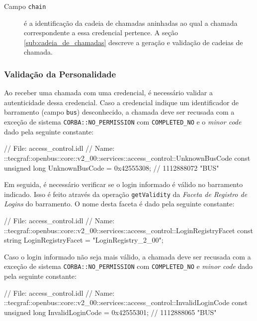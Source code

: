 \documentclass[]{article}
\newcommand{\term}[1]{\textit{#1}}
\newcommand{\code}[1]{\texttt{#1}}
\begin{document}
\begin{description}
	\item[Campo \code{chain}] é a identificação da cadeia de chamadas aninhadas ao qual a chamada correspondente a essa credencial pertence.
	A seção \ref{sub:cadeia_de_chamadas} descreve a geração e validação de cadeias de chamada.

\end{description}

\subsubsection{Validação da Personalidade} %
\label{sub:validacao_da_personalidade}

Ao receber uma chamada com uma credencial, é necessário validar a autenticidade dessa credencial.
Caso a credencial indique um identificador de barramento (campo \code{bus}) desconhecido, a chamada deve ser recusada com a exceção de sistema \code{CORBA::NO\_PERMISSION} com \code{COMPLETED\_NO} e o \term{minor code} dado pela seguinte constante:

\begin{samplecode}[language={[CORBA]idl}]
// File: access_control.idl
// Name: ::tecgraf::openbus::core::v2_00::services::access_control::UnknownBusCode
const unsigned long UnknownBusCode = 0x42555308; // 1112888072 "BUS\8"
\end{samplecode}

Em seguida, é necessário verificar se o login informado é válido no barramento indicado.
Isso é feito através da operação \code{getValidity} da \term{Faceta de Registro de Logins} do barramento.
O nome desta faceta é dado pela seguinte constante:

\begin{samplecode}[language={[CORBA]idl}]
// File: access_control.idl
// Name: ::tecgraf::openbus::core::v2_00::services::access_control::LoginRegistryFacet
const string LoginRegistryFacet = "LoginRegistry_2_00";
\end{samplecode}

Caso o login informado não seja mais válido, a chamada deve ser recusada com a exceção de sistema \code{CORBA::NO\_PERMISSION} com \code{COMPLETED\_NO} e \term{minor code} dado pela seguinte constante:

\begin{samplecode}[language={[CORBA]idl}]
// File: access_control.idl
// Name: ::tecgraf::openbus::core::v2_00::services::access_control::InvalidLoginCode
const unsigned long InvalidLoginCode = 0x42555301; // 1112888065 "BUS\1"
\end{samplecode}
\end{document}
